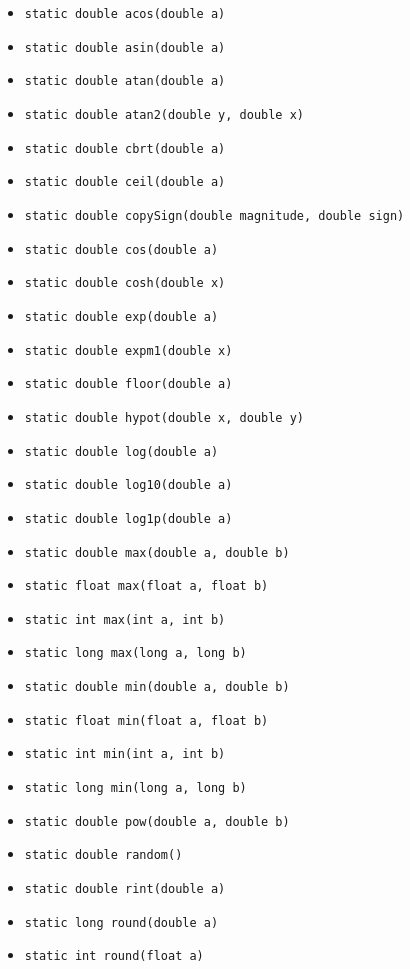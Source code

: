 \documentclass[a4paper]{report}
\begin{document}
\begin{itemize}
\begin{itemize}
\begin{itemize}
				\item \texttt{static double acos(double a)}
				\item \texttt{static double asin(double a)}
				\item \texttt{static double atan(double a)}
				\item \texttt{static double atan2(double y, double x)}
				\item \texttt{static double cbrt(double a)}
				\item \texttt{static double ceil(double a)}
				\item \texttt{static double copySign(double magnitude, double sign)}				
				\item \texttt{static double cos(double a)}
				\item \texttt{static double cosh(double x)}
				\item \texttt{static double exp(double a)}
				\item \texttt{static double expm1(double x)}
				\item \texttt{static double floor(double a)}
				\item \texttt{static double hypot(double x, double y)}
				\item \texttt{static double	log(double a)}
				\item \texttt{static double	log10(double a)}
				\item \texttt{static double	log1p(double a)}
				\item \texttt{static double max(double a, double b)}
				\item \texttt{static float max(float a, float b)}
				\item \texttt{static int max(int a, int b)}
				\item \texttt{static long max(long a, long b)}
				\item \texttt{static double min(double a, double b)}
				\item \texttt{static float min(float a, float b)}
				\item \texttt{static int min(int a, int b)}
				\item \texttt{static long min(long a, long b)}
				\item \texttt{static double pow(double a, double b)}
				\item \texttt{static double random()}
				\item \texttt{static double rint(double a)}
				\item \texttt{static long round(double a)}
				\item \texttt{static int round(float a)}

\end{itemize}
\end{itemize}
\end{itemize}
\end{document}
